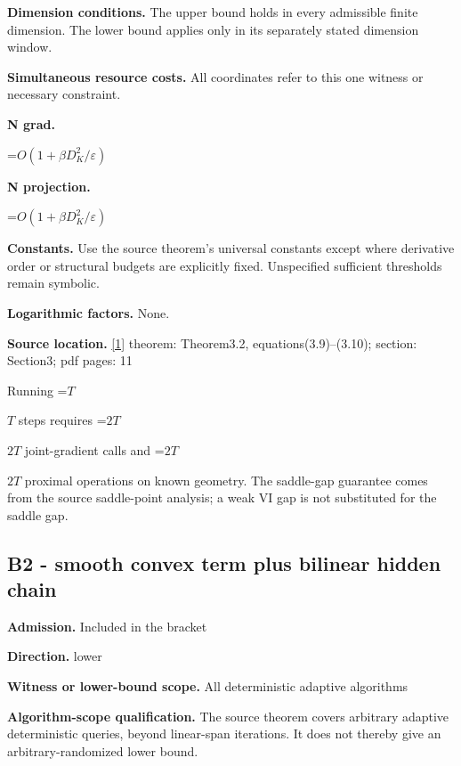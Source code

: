 \documentclass[10pt,a4paper]{article}
\newcommand{\AtlasMath}[1]{\par\begingroup\centering\setbox0=\hbox{$\displaystyle #1$}\ifdim\wd0>1.4\linewidth\typeout{ATLAS WIDE FORMULA: \the\wd0}\fi\ifdim\wd0>\linewidth\resizebox{\linewidth}{!}{\box0}\else\box0\fi\par\endgroup}
\newcommand{\AtlasInlineMath}[1]{\begingroup\setbox0=\hbox{$#1$}\ifdim\wd0>.4\linewidth\endgroup\AtlasMath{#1}\else\endgroup$#1$\fi}
\begin{document}
\textbf{Dimension conditions.} The upper bound holds in every admissible finite dimension. The lower bound applies only in its separately stated dimension window.



\textbf{Simultaneous resource costs.} All coordinates refer to this one witness or necessary constraint.



\textbf{N grad.}



\AtlasMath{O(1+\beta D_K^2/\varepsilon)}


\textbf{N projection.}



\AtlasMath{O(1+\beta D_K^2/\varepsilon)}


\textbf{Constants.} Use the source theorem’s universal constants except where derivative order or structural budgets are explicitly fixed. Unspecified sufficient thresholds remain symbolic.



\textbf{Logarithmic factors.} None.



\textbf{Source location.} \href{https://www2.isye.gatech.edu/~nemirovs/SIOPT_MP_2004.pdf}{[1]} theorem: Theorem3.2, equations(3.9)--(3.10); section: Section3; pdf pages: 11



Running \AtlasInlineMath{T} steps requires \AtlasInlineMath{2T} joint-gradient calls and \AtlasInlineMath{2T} proximal operations on known geometry. The saddle-gap guarantee comes from the source saddle-point analysis; a weak VI gap is not substituted for the saddle gap.



\subsection{B2 - smooth convex term plus bilinear hidden chain}


\textbf{Admission.} Included in the bracket



\textbf{Direction.} lower



\textbf{Witness or lower-bound scope.} All deterministic adaptive algorithms



\textbf{Algorithm-scope qualification.} The source theorem covers arbitrary adaptive deterministic queries, beyond linear-span iterations. It does not thereby give an arbitrary-randomized lower bound.
\end{document}
